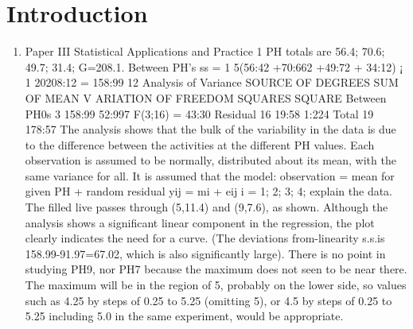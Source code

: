 \documentclass[a4paper,12pt]{article}
\begin{document}
\section{Introduction}
\begin{enumerate}
    \item 
    
    
    Paper III
Statistical Applications and Practice
1 PH totals are 56.4; 70.6; 49.7; 31.4; G=208.1. Between PH’s ss = 1
5(56:42 +70:662 +49:72 +
34:12) ¡ 1
20208:12 = 158:99
12
Analysis of Variance
SOURCE OF DEGREES SUM OF MEAN
V ARIATION OF FREEDOM SQUARES SQUARE
Between PH0s 3 158:99 52:997 F(3;16) = 43:30
Residual 16 19:58 1:224
Total 19 178:57
The analysis shows that the bulk of the variability in the data is due to the difference
between the activities at the different PH values. Each observation is assumed to be normally,
distributed about its mean, with the same variance for all. It is assumed that the model:
observation = mean for given PH + random residual yij = mi + eij i = 1; 2; 3; 4; explain
the data.
The filled live passes through (5,11.4) and (9,7.6), as shown. Although the analysis shows a significant
linear component in the regression, the plot clearly indicates the need for a curve. (The
deviations from-linearity s.s.is 158.99-91.97=67.02, which is also significantly large). There is
no point in studying PH9, nor PH7 because the maximum does not seen to be near there.
The maximum will be in the region of 5, probably on the lower side, so values such as 4.25
by steps of 0.25 to 5.25 (omitting 5), or 4.5 by steps of 0.25 to 5.25 including 5.0 in the same
experiment, would be appropriate.

\end{enumerate}
\end{document}
